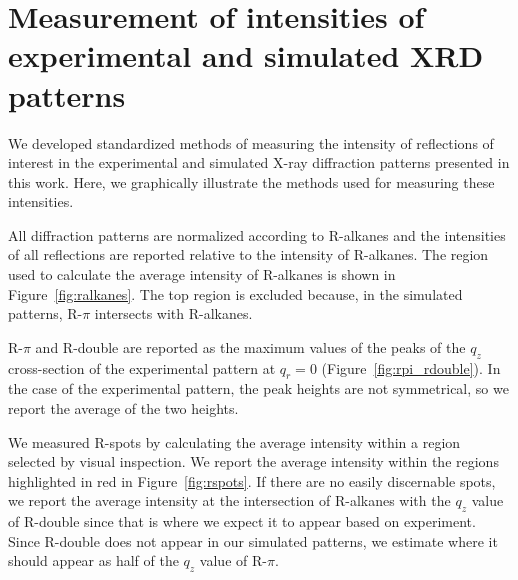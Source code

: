 \documentclass[journal=jpcbfk,manusciprt=article]{achemso}
\begin{document}
  \section{Measurement of intensities of experimental and simulated XRD patterns}\label{section:xrd_intensities}
  
  We developed standardized methods of measuring the intensity of reflections of interest
  in the experimental and simulated X-ray diffraction patterns presented in this work. Here,
  we graphically illustrate the methods used for measuring these intensities. 
  
  All diffraction patterns are normalized according to R-alkanes and the intensities
  of all reflections are reported relative to the intensity of R-alkanes. The region
  used to calculate the average intensity of R-alkanes is shown in 
  Figure~\ref{fig:ralkanes}. The top region is excluded because, in the simulated
  patterns, R-$\pi$ intersects with R-alkanes.
  
  R-$\pi$ and R-double are reported as the maximum values of the peaks of the 
  $q_z$ cross-section of the experimental pattern at $q_r=0$ (Figure~\ref{fig:rpi_rdouble}).
  In the case of the experimental pattern, the peak heights are not symmetrical,
  so we report the average of the two heights.
  
  We measured R-spots by calculating the average intensity within a region 
  selected by visual inspection. We report the average intensity within the regions 
  highlighted in red in Figure~\ref{fig:rspots}. If there are no easily discernable
  spots, we report the average intensity at the intersection of R-alkanes with
  the $q_z$ value of R-double since that is where we expect it to appear based on
  experiment. Since R-double does not appear in our simulated patterns, we 
  estimate where it should appear as half of the $q_z$ value of R-$\pi$.
  
\end{document}
